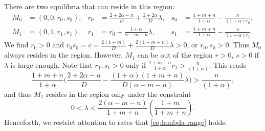 \documentclass[a4paper,11pt]{article}
\theoremstyle{remark}
\begin{document}
There are two equilibria that can reside in this region:
\begin{align*}
 M_0 &= (0,0,r_0,s_0), & r_0 &=\frac{2+2\alpha-n}{D} + \frac{2+2\alpha}{D}\lambda, & s_0&=\frac{1+m+n}{1+\alpha} - \frac{n}{(1+\alpha)r_0},\\
 M_1 &= (0,1,r_1,s_1), & r_1 &= r_0-\frac{1+\alpha}{\alpha-m-n}\lambda, & s_1&=\frac{1+m+n}{1+\alpha} - \frac{n}{(1+\alpha)r_1}.
\end{align*}
We find $r_0>0$ and $r_0s_0 = c = \frac{2(1+m)}{D} + \frac{2(1+m+n)}{D}\lambda>0$, or $r_0, s_0>0$. Thus $M_0$ always resides in the region. However, $M_1$ can be out of the region $r>0$, $s>0$ if $\lambda$ is large enough. Note that $r_1,s_1>0$ only if $\frac{1+m+n}{1+\alpha}r_1 > \frac{n}{(1+\alpha)}$. This reads
$$\frac{1+m+n}{1+\alpha}\Big(\frac{2+2\alpha-n}{D} - \frac{(1+\alpha)(1+m+n)}{D(\alpha-m-n)}\lambda\Big) > \frac{n}{(1+\alpha)},$$
and thus $M_1$ resides in the region only under the constraint
\begin{equation} \label{eq:lambda-range}
 0< \lambda < \frac{2(\alpha-m-n)}{1+m+n}\left(\frac{1+m}{1+m+n}\right).
\end{equation}
Henceforth, we restrict attention to rates that \eqref{eq:lambda-range} holds.
\end{document}
